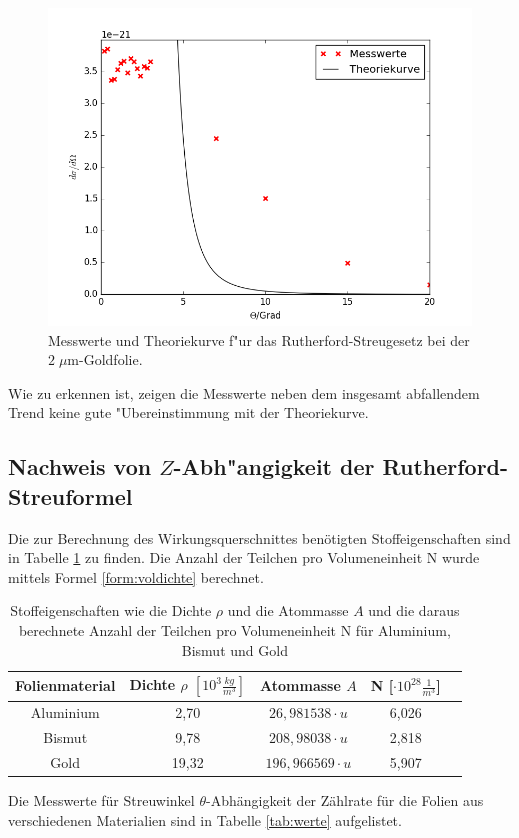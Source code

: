   \begin{figure}
    \centering
    \includegraphics[width=15cm]{skripte/ruther.png}
    \caption{Messwerte und Theoriekurve f"ur das Rutherford-Streugesetz bei der $2\; \mu \text{m}$-Goldfolie.}
    \label{plot:ruther}
  \end{figure}

  Wie zu erkennen ist, zeigen die Messwerte neben dem insgesamt abfallendem Trend keine gute "Ubereinstimmung mit der Theoriekurve.

  \newpage



  \subsection{Nachweis von $Z$-Abh"angigkeit der Rutherford-Streuformel}

Die zur Berechnung des Wirkungsquerschnittes benötigten Stoffeigenschaften sind in Tabelle \ref{tab:voldichte} zu finden. Die Anzahl der Teilchen pro Volumeneinheit N wurde mittels Formel \ref{form:voldichte} berechnet.

\begin{table}[H]
\centering
\begin{tabular}{c|c c c c}

	Folienmaterial & Dichte $\rho$ $[10^3 \frac{kg}{m^3}]$ & Atommasse $A$ & N [$\cdot 10^{28} \frac{1}{m^3}$] \\
	\hline
	Aluminium \cite{3} & 2,70 & $26,981538 \cdot u$ & 6,026 \\

	Bismut \cite{4} & 9,78 & $208,98038 \cdot u$ & 2,818 \\

	Gold \cite{5} & 19,32 & $196,966569 \cdot u$ & 5,907  \\

\end{tabular}
	\caption{Stoffeigenschaften wie die Dichte $\rho $ und die Atommasse $A$ und die daraus berechnete Anzahl der Teilchen pro Volumeneinheit N für Aluminium, Bismut und Gold }
	\label{tab:voldichte}
\end{table}
Die Messwerte für Streuwinkel $\theta$-Abhängigkeit der Zählrate für die Folien aus verschiedenen Materialien sind in Tabelle \ref{tab:werte} aufgelistet.

